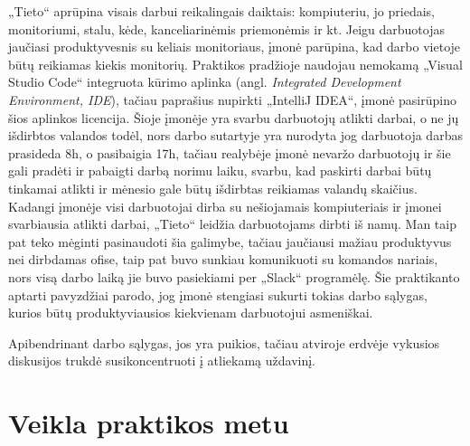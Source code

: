 \documentclass{VUMIFPSbakalaurinis}
\begin{document}
„Tieto“ aprūpina visais darbui reikalingais daiktais: kompiuteriu, jo priedais, monitoriumi, stalu, kėde, kanceliarinėmis priemonėmis ir kt. Jeigu darbuotojas jaučiasi produktyvesnis su keliais monitoriaus, įmonė parūpina, kad darbo vietoje būtų reikiamas kiekis monitorių. Praktikos pradžioje naudojau nemokamą „Visual Studio Code“ integruota kūrimo aplinka (angl. \textit{Integrated Development Environment, IDE}), tačiau paprašius nupirkti „IntelliJ IDEA“, įmonė pasirūpino šios aplinkos licencija. Šioje įmonėje yra svarbu darbuotojų atlikti darbai, o ne jų išdirbtos valandos todėl, nors darbo sutartyje yra nurodyta jog darbuotoja darbas prasideda 8h, o pasibaigia 17h, tačiau realybėje įmonė nevaržo darbuotojų ir šie gali pradėti ir pabaigti darbą norimu laiku, svarbu, kad paskirti darbai būtų tinkamai atlikti ir mėnesio gale būtų išdirbtas reikiamas valandų skaičius. Kadangi įmonėje visi darbuotojai dirba su nešiojamais kompiuteriais ir įmonei svarbiausia atlikti darbai, „Tieto“ leidžia darbuotojams dirbti iš namų. Man taip pat teko mėginti pasinaudoti šia galimybe, tačiau jaučiausi mažiau produktyvus nei dirbdamas ofise, taip pat buvo sunkiau komunikuoti su komandos nariais, nors visą darbo laiką jie buvo pasiekiami per „Slack“ programėlę. Šie praktikanto aptarti pavyzdžiai parodo, jog įmonė stengiasi sukurti tokias darbo sąlygas, kurios būtų produktyviausios kiekvienam darbuotojui asmeniškai. 

Apibendrinant darbo sąlygas, jos yra puikios, tačiau atviroje erdvėje vykusios diskusijos trukdė susikoncentruoti į atliekamą uždavinį.
\section{Veikla praktikos metu}
\end{document}
